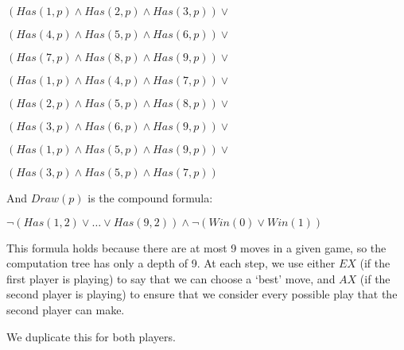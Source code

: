 \begin{enumerate}[label=(\alph*)]
    $(Has(1,p) \wedge Has(2,p) \wedge Has(3,p)) \vee$

    $(Has(4,p) \wedge Has(5,p) \wedge Has(6,p)) \vee$

    $(Has(7,p) \wedge Has(8,p) \wedge Has(9,p)) \vee$

    $(Has(1,p) \wedge Has(4,p) \wedge Has(7,p)) \vee$

    $(Has(2,p) \wedge Has(5,p) \wedge Has(8,p)) \vee$

    $(Has(3,p) \wedge Has(6,p) \wedge Has(9,p)) \vee$

    $(Has(1,p) \wedge Has(5,p) \wedge Has(9,p)) \vee$

    $(Has(3,p) \wedge Has(5,p) \wedge Has(7,p))$

    And $Draw(p)$ is the compound formula:

    $\neg (Has(1, 2) \vee \ldots \vee Has(9,2)) \wedge \neg (Win(0) \vee Win(1))$

    This formula holds because there are at most 9 moves in a given game, so the computation tree has only a depth of 9. At each step, we use either $E X$ (if the first player is playing) to say that we can choose a `best' move, and $A X$ (if the second player is playing) to ensure that we consider every possible play that the second player can make.

    We duplicate this for both players.





\end{enumerate}

